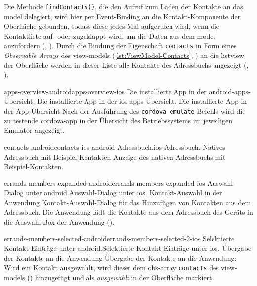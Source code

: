 
Die Methode \lstinline|findContacts()|, die den Aufruf zum Laden der Kontakte an das \gls{model} delegiert, wird hier per Event-Binding an die Kontakt-Komponente der Oberfläche gebunden, sodass diese jedes Mal aufgerufen wird, wenn die Kontaktliste auf- oder zugeklappt wird, um die Daten aus dem \gls{model} anzufordern (, ).
Durch die Bindung der Eigenschaft \lstinline|contacts| in Form eines \emph{Observable Arrays} des \glspl{view-model} (\autoref{lst:ViewModel-Contacts}, ) an die \gls{listview} der Oberfläche werden in dieser Liste alle Kontakte des Adressbuchs angezeigt (, ).

	
	\pagebreak
	
	{apps-overview-android}{apps-overview-ios}
	{Die installierte App in der \gls{android}-\glspl{app}-Übersicht.}
	{Die installierte App in der \gls{ios}-\glspl{app}-Übersicht.}
	{Die installierte App in der App-Übersicht}
	{Nach der Ausführung des \lstinline|cordova emulate|-Befehls wird die zu testende \gls{cordova}-\gls{app} in der Übersicht des Betriebssystems im jeweiligen Emulator angezeigt.}
	{\ownScreenshot}
	
	{contacts-android}{contacts-ios}
	{\gls{android}-Adressbuch.}{\gls{ios}-Adressbuch.}
	{Natives Adressbuch mit Beispiel-Kontakten}
	{Anzeige des nativen Adressbuchs mit Beispiel-Kontakten.}
	{\ownScreenshot}
	
	{errands-members-expanded-android}{errands-members-expanded-ios}
	{Auswahl-Dialog unter \gls{android}.}{Auswahl-Dialog unter \gls{ios}.}
	{Kontakt-Auswahl in der Anwendung}
	{Kontakt-Auswahl-Dialog für das Hinzufügen von Kontakten aus dem Adressbuch. Die Anwendung lädt die Kontakte aus dem Adressbuch des Geräts in die Auswahl-Box der Anwendung ().}
	{\ownScreenshot}
	
	{errands-members-selected-android}{errands-members-selected-2-ios}
	{Selektierte Kontakt-Einträge unter \gls{android}.}{Selektierte Kontakt-Einträge unter \gls{ios}.}
	{Übergabe der Kontakte an die Anwendung}
	{Übergabe der Kontakte an die Anwendung: Wird ein Kontakt ausgewählt, wird dieser dem \gls{obs}-\gls{array} \lstinline|contacts| des \glspl{view-model} () hinzugefügt und als \emph{ausgewählt} in der Oberfläche markiert.}
	{\ownScreenshot}
	

